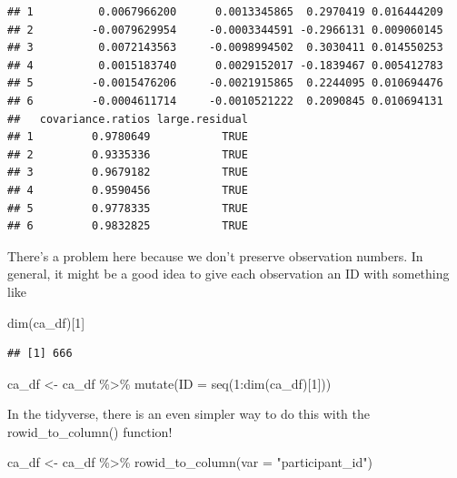 \documentclass[
]{book}
\newenvironment{Shaded}{\begin{snugshade}}{\end{snugshade}}
\newcommand{\AttributeTok}[1]{\textcolor[rgb]{0.77,0.63,0.00}{#1}}
\newcommand{\DecValTok}[1]{\textcolor[rgb]{0.00,0.00,0.81}{#1}}
\newcommand{\FunctionTok}[1]{\textcolor[rgb]{0.00,0.00,0.00}{#1}}
\newcommand{\NormalTok}[1]{#1}
\newcommand{\OtherTok}[1]{\textcolor[rgb]{0.56,0.35,0.01}{#1}}
\newcommand{\SpecialCharTok}[1]{\textcolor[rgb]{0.00,0.00,0.00}{#1}}
\newcommand{\StringTok}[1]{\textcolor[rgb]{0.31,0.60,0.02}{#1}}
\begin{document}
\begin{verbatim}
## 1          0.0067966200      0.0013345865  0.2970419 0.016444209
## 2         -0.0079629954     -0.0003344591 -0.2966131 0.009060145
## 3          0.0072143563     -0.0098994502  0.3030411 0.014550253
## 4          0.0015183740      0.0029152017 -0.1839467 0.005412783
## 5         -0.0015476206     -0.0021915865  0.2244095 0.010694476
## 6         -0.0004611714     -0.0010521222  0.2090845 0.010694131
##   covariance.ratios large.residual
## 1         0.9780649           TRUE
## 2         0.9335336           TRUE
## 3         0.9679182           TRUE
## 4         0.9590456           TRUE
## 5         0.9778335           TRUE
## 6         0.9832825           TRUE
\end{verbatim}

There's a problem here because we don't preserve observation numbers. In general, it might be a good idea to give each observation an ID with something like

\begin{Shaded}
\begin{Highlighting}[]
\FunctionTok{dim}\NormalTok{(ca\_df)[}\DecValTok{1}\NormalTok{]}
\end{Highlighting}
\end{Shaded}

\begin{verbatim}
## [1] 666
\end{verbatim}

\begin{Shaded}
\begin{Highlighting}[]
\NormalTok{ca\_df }\OtherTok{\textless{}{-}}\NormalTok{ ca\_df }\SpecialCharTok{\%\textgreater{}\%} 
  \FunctionTok{mutate}\NormalTok{(}\AttributeTok{ID =} \FunctionTok{seq}\NormalTok{(}\DecValTok{1}\SpecialCharTok{:}\FunctionTok{dim}\NormalTok{(ca\_df)[}\DecValTok{1}\NormalTok{]))}
\end{Highlighting}
\end{Shaded}

In the tidyverse, there is an even simpler way to do this with the rowid\_to\_column() function!

\begin{Shaded}
\begin{Highlighting}[]
\NormalTok{ca\_df }\OtherTok{\textless{}{-}}\NormalTok{ ca\_df }\SpecialCharTok{\%\textgreater{}\%} 
  \FunctionTok{rowid\_to\_column}\NormalTok{(}\AttributeTok{var =} \StringTok{"participant\_id"}\NormalTok{)}
\end{Highlighting}
\end{Shaded}
\end{document}
